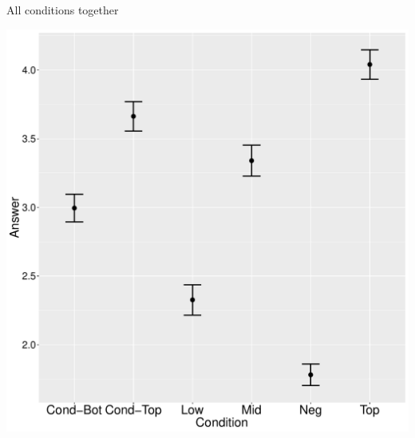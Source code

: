 \documentclass[ignorenonframetext,]{beamer}
\begin{document}
\begin{frame}{All conditions together}

\begin{center}
\includegraphics[scale=0.3]{exp1-part_1-2-errorbars.pdf}
\end{center}

\end{frame}
\end{document}

